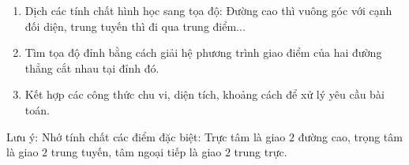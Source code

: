 \begin{enumerate}
\item Dịch các tính chất hình học sang tọa độ: Đường cao thì vuông góc với cạnh đối diện, trung tuyến thì đi qua trung điểm...
\item Tìm tọa độ đỉnh bằng cách giải hệ phương trình giao điểm của hai đường thẳng cắt nhau tại đỉnh đó.
\item Kết hợp các công thức chu vi, diện tích, khoảng cách để xử lý yêu cầu bài toán.
\end{enumerate}
Lưu ý: Nhớ tính chất các điểm đặc biệt: Trực tâm là giao $2$ đường cao, trọng tâm là giao $2$ trung tuyến, tâm ngoại tiếp là giao $2$ trung trực.
